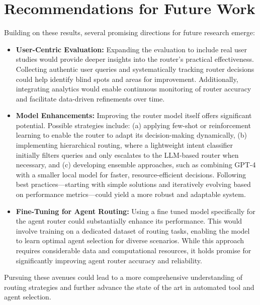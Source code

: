 \section{Recommendations for Future Work}
\label{sec:results-recommendations}

Building on these results, several promising directions for future research emerge:

\begin{itemize}
    \item \textbf{User-Centric Evaluation:} Expanding the evaluation to include real user studies would provide deeper insights into the router's practical effectiveness. Collecting authentic user queries and systematically tracking router decisions could help identify blind spots and areas for improvement. Additionally, integrating analytics would enable continuous monitoring of router accuracy and facilitate data-driven refinements over time.
    
    \item \textbf{Model Enhancements:} Improving the router model itself offers significant potential. Possible strategies include: (a) applying few-shot or reinforcement learning to enable the router to adapt its decision-making dynamically, (b) implementing hierarchical routing, where a lightweight intent classifier initially filters queries and only escalates to the LLM-based router when necessary, and (c) developing ensemble approaches, such as combining GPT-4 with a smaller local model for faster, resource-efficient decisions. Following best practices—starting with simple solutions and iteratively evolving based on performance metrics—could yield a more robust and adaptable system.
    
    \item \textbf{Fine-Tuning for Agent Routing:} Using a fine tuned model specifically for the agent router could substantially enhance its performance. This would involve training on a dedicated dataset of routing tasks, enabling the model to learn optimal agent selection for diverse scenarios. While this approach requires considerable data and computational resources, it holds promise for significantly improving agent router accuracy and reliability.
\end{itemize}

Pursuing these avenues could lead to a more comprehensive understanding of routing strategies and further advance the state of the art in automated tool and agent selection.

